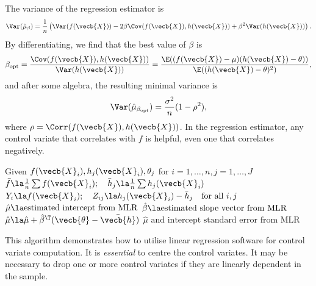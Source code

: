 The variance of the regression estimator is
\begin{equation}
	\Var(\hat{\mu}_{\beta}) = \frac{1}{n} \left(\Var(f(\vecb{X})) - 2\beta \Cov(f(\vecb{X}), h(\vecb{X})) + \beta^2 \Var(h(\vecb{X}))\right).
	\label{eq:RegressionEstimatorVariance}
\end{equation}
By differentiating, we find that the best value of \(\beta\) is
\begin{equation}
	\beta_{\text{opt}} = \frac{\Cov(f(\vecb{X}), h(\vecb{X}))}{\Var(h(\vecb{X}))} = \frac{\E((f(\vecb{X}) - \mu) (h(\vecb{X}) - \theta))}{\E((h(\vecb{X}) - \theta)^2)},
	\label{eq:BetaOptFormula}
\end{equation}
and after some algebra, the resulting minimal variance is
\begin{equation}
	\Var(\hat{\mu}_{\beta_{\text{opt}}}) = \frac{\sigma^2}{n} (1 - \rho^2),
	\label{eq:MinVarianceRho}
\end{equation}
where \(\rho = \Corr(f(\vecb{X}), h(\vecb{X}))\). In the regression estimator, any control variate that correlates with \(f\) is helpful, even one that correlates negatively.

\begin{algorithm}[H]
	\caption{Control Variates by Regression}
	\label{alg:ControlVariatesbyRegression}
	\begin{algorithmic}[1]
		\Require Given \(f(\vecb{X}_i), h_j(\vecb{X}_i), \theta_j\) for \(i=1,\dots,n, j=1,\dots,J\)
		\State \(\bar{f} \la \frac{1}{n}\sum f(\vecb{X}_i); \quad \bar{h}_j \la \frac{1}{n}\sum h_j(\vecb{X}_i)\)
		\State \(Y_{i} \la f(\vecb{X}_i); \quad Z_{i j} \la h_j(\vecb{X}_i) - \bar{h}_j \quad \text{for all } i, j\)
		\State \(\hat{\mu} \la \text{estimated intercept from MLR}\)
		\State \(\hat{\beta} \la \text{estimated slope vector from MLR}\)
		\State \(\hat{\mu} \la \hat{\mu} + \hat{\beta}^{\T} (\vecb{\theta} - \bar{\vecb{h}})\)
		\State \Return \(\hat{\mu} \text{ and intercept standard error from MLR}\)
	\end{algorithmic}
\end{algorithm}

This algorithm demonstrates how to utilise linear regression software for control variate computation. It is \textit{essential} to centre the control variates. It may be necessary to drop one or more control variates if they are linearly dependent in the sample.

